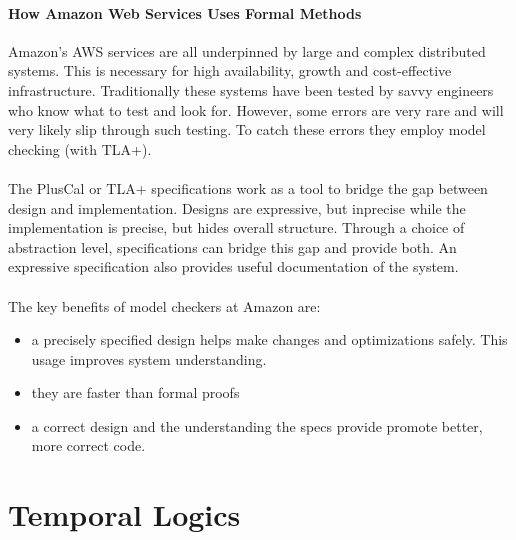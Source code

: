 \documentclass{uit-thesis}
\begin{document}
\paragraph{How Amazon Web Services Uses Formal Methods~\cite{Amazon2015}}
Amazon's AWS services are all underpinned by large and complex distributed systems. This is necessary for high availability, growth and cost-effective infrastructure. Traditionally these systems have been tested by savvy engineers who know what to test and look for. However, some errors are very rare and will very likely slip through such testing. To catch these errors they employ model checking (with TLA+).
\\\\
The PlusCal or TLA+ specifications work as a tool to bridge the gap between design and implementation. Designs are expressive, but inprecise while the implementation is precise, but hides overall structure. Through a choice of abstraction level, specifications can bridge this gap and provide both. An expressive specification also provides useful documentation of the system.
\\\\
The key benefits of model checkers at Amazon are:
\begin{itemize}
    \item a precisely specified design helps make changes and optimizations safely. This usage improves system understanding.
    \item they are faster than formal proofs
    \item a correct design and the understanding the specs provide promote better, more correct code.
\end{itemize}

\section{Temporal Logics}\label{sec:TL}
\end{document}
